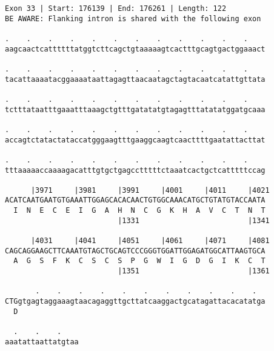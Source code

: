 \documentclass{article}
\begin{document}
\begin{Verbatim}
Exon 33 | Start: 176139 | End: 176261 | Length: 122
BE AWARE: Flanking intron is shared with the following exon
 
.    .    .    .    .    .    .    .    .    .    .    .    
aagcaactcattttttatggtcttcagctgtaaaaagtcactttgcagtgactggaaact
  
.    .    .    .    .    .    .    .    .    .    .    .    
tacattaaaatacggaaaataattagagttaacaatagctagtacaatcatattgttata
  
.    .    .    .    .    .    .    .    .    .    .    .    
tctttataatttgaaatttaaagctgtttgatatatgtagagtttatatatggatgcaaa
  
.    .    .    .    .    .    .    .    .    .    .    .    
accagtctatactataccatgggaagtttgaaggcaagtcaacttttgaatattacttat
  
.    .    .    .    .    .    .    .    .    .    .    .    
tttaaaaaccaaaagacatttgtgctgagcctttttctaaatcactgctcatttttccag
  
      |3971     |3981     |3991     |4001     |4011     |4021
ACATCAATGAATGTGAAATTGGAGCACACAACTGTGGCAAACATGCTGTATGTACCAATA
  I  N  E  C  E  I  G  A  H  N  C  G  K  H  A  V  C  T  N  T
                          |1331                         |1341
  
      |4031     |4041     |4051     |4061     |4071     |4081
CAGCAGGAAGCTTCAAATGTAGCTGCAGTCCCGGGTGGATTGGAGATGGCATTAAGTGCA
  A  G  S  F  K  C  S  C  S  P  G  W  I  G  D  G  I  K  C  T
                          |1351                         |1361
  
       .    .    .    .    .    .    .    .    .    .    .  
CTGgtgagtaggaaagtaacagaggttgcttatcaaggactgcatagattacacatatga
  D                                                         
  
  .    .    .    
aaatattaattatgtaa
\end{Verbatim}
\newpage
\end{document}
